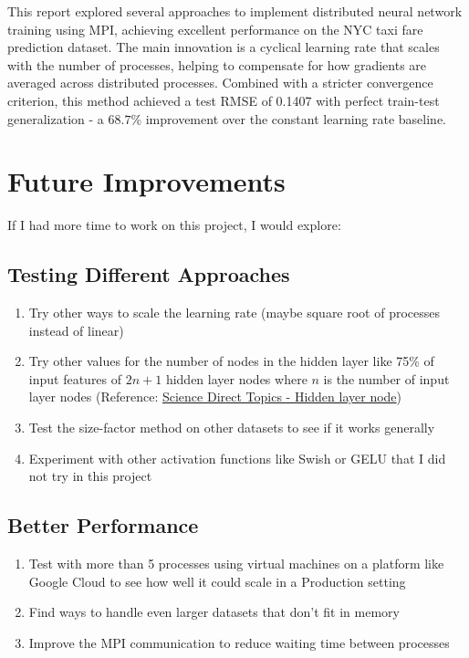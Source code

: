 \documentclass{article}
\begin{document}
This report explored several approaches to implement distributed neural network training using MPI, achieving excellent performance on the NYC taxi fare prediction dataset. The main innovation is a cyclical learning rate that scales with the number of processes, helping to compensate for how gradients are averaged across distributed processes. Combined with a stricter convergence criterion, this method achieved a test RMSE of 0.1407 with perfect train-test generalization - a $68.7$\% improvement over the constant learning rate baseline.

\section{Future Improvements}

If I had more time to work on this project, I would explore:

\subsection{Testing Different Approaches}
\begin{enumerate}
    \item Try other ways to scale the learning rate (maybe square root of processes instead of linear)
    \item Try other values for the number of nodes in the hidden layer like 75\% of input features of $2n+1$ hidden layer nodes where $n$ is the number of input layer nodes (Reference: \href{https://www.sciencedirect.com/topics/engineering/hidden-layer-node}{Science Direct Topics - Hidden layer node})
    \item Test the size-factor method on other datasets to see if it works generally
    \item Experiment with other activation functions like Swish or GELU that I did not try in this project
\end{enumerate}

\subsection{Better Performance}
\begin{enumerate}
    \item Test with more than 5 processes using virtual machines on a platform like Google Cloud to see how well it could scale in a Production setting
    \item Find ways to handle even larger datasets that don't fit in memory
    \item Improve the MPI communication to reduce waiting time between processes
\end{enumerate}
\end{document}

